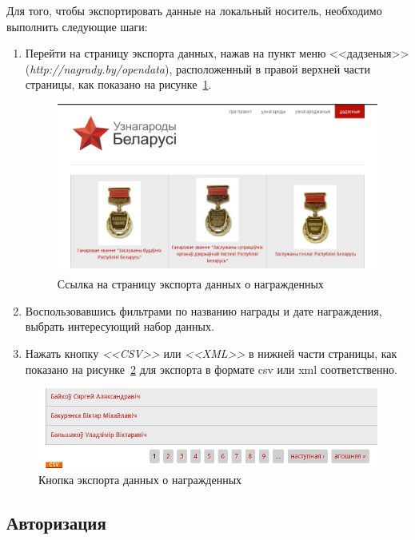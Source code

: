 Для того, чтобы экспортировать данные на локальный носитель,
необходимо выполнить следующие шаги:
\begin{enumerate}
\item Перейти на страницу экспорта данных, 
  нажав на пункт меню <<дадзеныя>> (\textit{http://nagrady.by/opendata}),
  расположенный в правой верхней части страницы, 
  как показано на рисунке~\ref{fig:opendata_link}.

\begin{figure}[h]
  \centering
  \includegraphics[width=160mm]{pic/help_opendata_link.png}
  \caption{Ссылка на страницу экспорта данных о награжденных}
  \label{fig:opendata_link}
\end{figure}

\item Воспользовавшись фильтрами по названию награды и дате награждения,
  выбрать интересующий набор данных.
\item Нажать кнопку \textit{<<CSV>>} или \textit{<<XML>>} в нижней части страницы, 
  как показано на рисунке~\ref{fig:opendata_download} 
  для экспорта в формате csv или xml соответственно.
\end{enumerate}

\begin{figure}[h]
  \centering
  \includegraphics[width=150mm]{pic/help_opendata_download.png}
  \caption{Кнопка экспорта данных о награжденных}
  \label{fig:opendata_download}
\end{figure}


\subsection{Авторизация}
\label{ssec:help_authorization}

